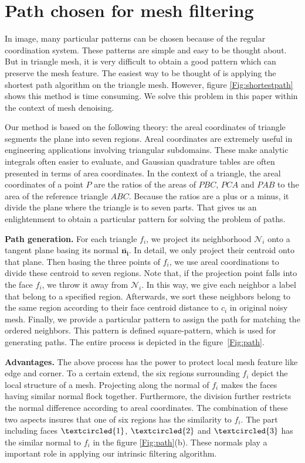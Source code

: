  \section{Path chosen for mesh filtering}
 \label{Sec:path}



 In image, many particular patterns can be chosen because of the regular coordination system.
 These patterns are simple and easy to be thought about.
 But in triangle mesh, it is very difficult to obtain a good pattern which can preserve the mesh feature.
 The easiest way to be thought of is applying the shortest path algorithm on the triangle mesh.
 However, figure \ref{Fig:shortestpath} shows this method is time consuming.
 We solve this problem in this paper within the context of mesh denoising.

 Our method is based on the following theory: the areal coordinates of triangle segments the plane into seven regions.
 Areal coordinates are extremely useful in engineering applications involving triangular subdomains.
 These make analytic integrals often easier to evaluate, and Gaussian quadrature tables are often presented in terms of area coordinates.
 In the context of a triangle, the areal coordinates of a point $P$ are the ratios of the areas of $PBC$, $PCA$ and $PAB$ to the area of the reference triangle $ABC$.
 Because the ratios are a plus or a minus, it divide the plane where the triangle is to seven parts.
 That gives us an enlightenment to obtain a particular pattern for solving the problem of paths.

{\bfseries Path generation.}
For each triangle $f_i$, we project its neighborhood $\mathcal{N}_i$ onto a tangent plane basing its normal $\mathbf{\bar{n_i}}$.
In detail, we only project their centroid onto that plane.
Then basing the three points of $f_i$, we use areal coordinations to divide these centroid to seven regions.
Note that, if the projection point falls into the face $f_i$, we throw it away from $\mathcal{N}_i$.
In this way, we give each neighbor a label that belong to a specified region.
Afterwards, we sort these neighbors belong to the same region according to their face centroid distance to $c_i$ in original noisy mesh.
Finally, we provide a particular pattern to assign the path for matching the ordered neighbors.
This pattern is defined square-pattern, which is used for generating paths.
The entire process is depicted in the figure~\ref{Fig:path}.

{\bfseries Advantages.}
 The above process has the power to protect local mesh feature like edge and corner.
 To a certain extend, the six regions surrounding $f_i$ depict the local structure of a mesh.
 Projecting along the normal of $f_i$ makes the faces having similar normal flock together.
 Furthermore, the division further restricts the normal difference according to areal coordinates.
 The combination of these two aspects insures that one of six regions has the similarity to $f_i$.
 The part including faces $\textcircled{1}$, $\textcircled{2}$ and $\textcircled{3}$ has the similar normal to $f_i$ in the figure \ref{Fig:path}(b).
 These normals play a important role in applying our intrinsic filtering algorithm.

